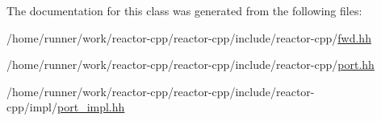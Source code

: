 The documentation for this class was generated from the following files\+:\begin{DoxyCompactItemize}
\item 
/home/runner/work/reactor-\/cpp/reactor-\/cpp/include/reactor-\/cpp/\hyperlink{fwd_8hh}{fwd.\+hh}\item 
/home/runner/work/reactor-\/cpp/reactor-\/cpp/include/reactor-\/cpp/\hyperlink{port_8hh}{port.\+hh}\item 
/home/runner/work/reactor-\/cpp/reactor-\/cpp/include/reactor-\/cpp/impl/\hyperlink{port__impl_8hh}{port\+\_\+impl.\+hh}\end{DoxyCompactItemize}
